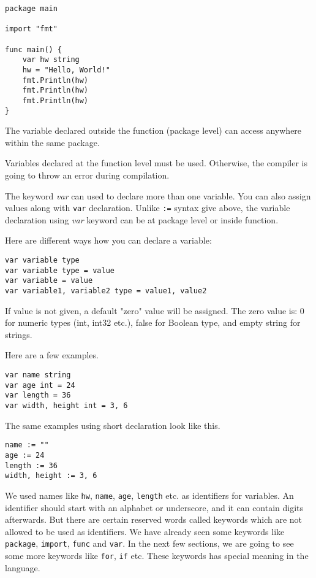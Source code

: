 \begin{lstlisting}[caption=Alternate syntax for variable declaration]
package main

import "fmt"

func main() {
    var hw string
    hw = "Hello, World!"
    fmt.Println(hw)
    fmt.Println(hw)
    fmt.Println(hw)
}
\end{lstlisting}

The variable declared outside the function (package level) can
access anywhere within the same package.

Variables declared at the function level must be used.  Otherwise, the
compiler is going to throw an error during compilation.

The keyword \textit{var} can used to declare more than one variable.
You can also assign values along with \texttt{var} declaration.
Unlike \texttt{:=} syntax give above, the variable declaration
using \textit{var} keyword can be at package level or inside function.

Here are different ways how you can declare a variable:

\begin{lstlisting}[numbers=none]
var variable type
var variable type = value
var variable = value
var variable1, variable2 type = value1, value2
\end{lstlisting}

If value is not given, a default "zero" value will be assigned.  The
zero value is: 0 for numeric types (int, int32 etc.), false for
Boolean type, and empty string for strings.

Here are a few examples.

\begin{lstlisting}[numbers=none]
var name string
var age int = 24
var length = 36
var width, height int = 3, 6
\end{lstlisting}

The same examples using short declaration look like this.

\begin{lstlisting}[numbers=none]
name := ""
age := 24
length := 36
width, height := 3, 6
\end{lstlisting}

We used names
like \texttt{hw}, \texttt{name}, \texttt{age}, \texttt{length} etc. as
identifiers for variables.  An identifier should start with an
alphabet or underscore, and it can contain digits afterwards.  But
there are certain reserved words called keywords which are not allowed
to be used as identifiers.  We have already seen some keywords
like \texttt{package}, \texttt{import}, \texttt{func}
and \texttt{var}.  In the next few sections, we are going to see some
more keywords like \texttt{for}, \texttt{if} etc.  These keywords has
special meaning in the language.

